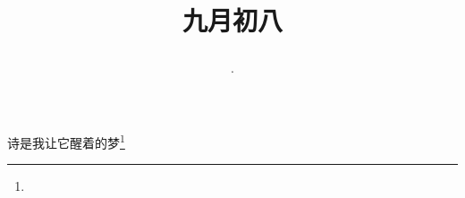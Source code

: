 \title{\date[d=10,m=10,y=2024][year:cn-y,年,month:cn,day:cn,日,·,weekday]·九月初八 }
诗是我让它醒着的梦\footnote{ }

